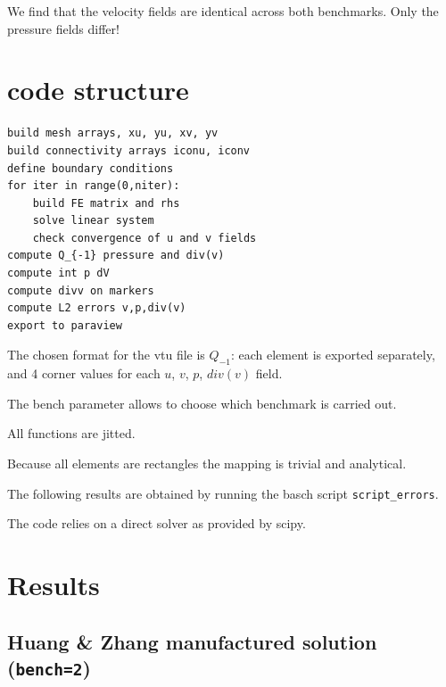 We find that the velocity fields are identical across 
both benchmarks. Only the pressure fields differ!

\section*{code structure}

\begin{verbatim}
build mesh arrays, xu, yu, xv, yv
build connectivity arrays iconu, iconv
define boundary conditions
for iter in range(0,niter):
    build FE matrix and rhs
    solve linear system
    check convergence of u and v fields
compute Q_{-1} pressure and div(v)
compute int p dV
compute divv on markers
compute L2 errors v,p,div(v)
export to paraview
\end{verbatim}
The chosen format for the vtu file is $Q_{-1}$: each element
is exported separately, and 4 corner values for 
each $u$, $v$, $p$, $div(v)$ field.

The {\python bench} parameter allows to choose 
which benchmark is carried out.

All functions are jitted.

Because all elements are rectangles the mapping is trivial
and analytical. 

The following results are obtained by running the basch script
{\tt script\_errors}.

The code relies on a direct solver as provided by scipy.

\newpage
\section*{Results}

\subsection*{Huang \& Zhang manufactured solution ({\tt bench=2})}

